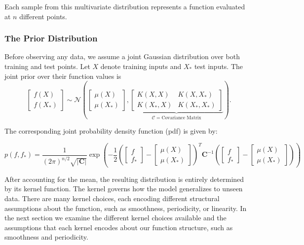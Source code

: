 \documentclass[10pt]{article}
\begin{document}
\noindent
Each sample from this multivariate distribution represents a function evaluated at \( n \) different points.

\subsubsection*{The Prior Distribution}
\label{sec: prior_dist}

Before observing any data, we assume a joint Gaussian distribution over both training and test points. Let \( X \) denote training inputs and \( X_* \) test inputs. 
The joint prior over their function values is
\begin{equation}
\begin{bmatrix}
f(X) \\
f(X_*)
\end{bmatrix}
\sim \mathcal{N}
\left(
\begin{bmatrix}
\mu(X) \\
\mu(X_*)
\end{bmatrix},
\underbrace{
\begin{bmatrix}
K(X, X) & K(X, X_*) \\
K(X_*, X) & K(X_*, X_*)
\end{bmatrix}
}_{\mathcal{C} = \text{Covariance Matrix}}
\right).
\label{eq: Multivariate prior}
\end{equation}

\noindent
The corresponding joint probability density function (pdf) is given by:

\begin{equation}
    p(f, f_*) = \frac{1}{(2\pi)^{n/2} \sqrt{|\mathbf{C}|}} \exp\left( 
    - \frac{1}{2}\left(\begin{bmatrix}f \\f_*\end{bmatrix}-
    \begin{bmatrix}\mu(X) \\\mu(X_*)\end{bmatrix}\right)^T
    \mathbf{C}^{-1}\left(
    \begin{bmatrix}f \\f_*\end{bmatrix}-
    \begin{bmatrix}\mu(X) \\\mu(X_*)\end{bmatrix}\right)\right)
\end{equation}
    

\noindent
After accounting for the mean, the resulting distribution is entirely determined by its kernel function.
The kernel governs how the model generalizes to unseen data. There are many kernel choices, each encoding different structural assumptions about the function, such as smoothness, periodicity, or linearity.
In the next section we examine the different kernel choices available and the assumptions that each kernel encodes about our function structure, such as smoothness and periodicity.
\end{document}
